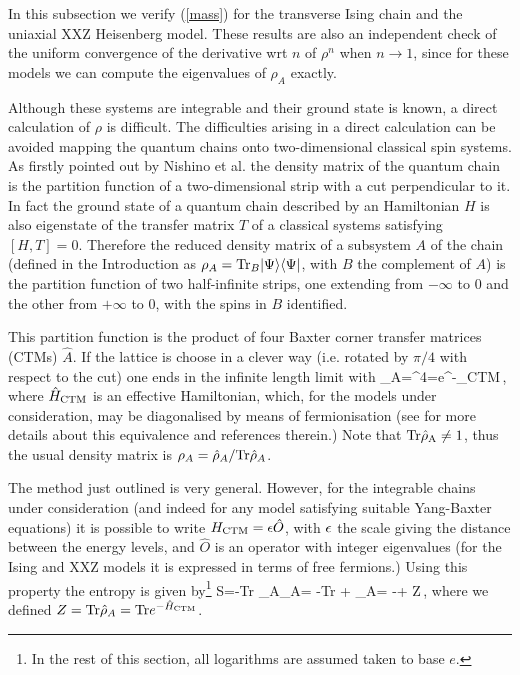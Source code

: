 \documentclass[preprint,aps]{revtex4}
\begin{document}
In this subsection we verify (\ref{mass})
for the transverse Ising chain and the uniaxial
XXZ Heisenberg model.
These results are also an
independent check of the uniform convergence of the derivative wrt $n$
of $\rho^n$ when $n\rightarrow1$, since for these models we can compute
the eigenvalues of $\rho_A$ exactly.

Although these systems are integrable and their ground state is known, a
direct calculation of $\rho$ is difficult. The difficulties arising in a
direct calculation can be avoided
mapping the quantum chains onto two-dimensional classical spin systems.
As firstly pointed out by Nishino et al. \cite{nishino}
the density matrix of the
quantum chain is the partition function of a two-dimensional strip with a cut
perpendicular to it. In fact the ground state of a quantum chain described
by an Hamiltonian $H$ is also eigenstate of the transfer matrix $T$ of a
classical systems satisfying $[H,T]=0$.
Therefore the reduced density matrix of a subsystem $A$ of the chain (defined
in the Introduction as
$\rho_A={\rm Tr}_B |\Psi\rangle\langle \Psi|$, with
$B$ the complement of $A$) is the
partition function of two half-infinite strips, one extending from $-\infty$
to $0$ and the other from $+\infty$ to 0, with the spins in $B$
identified.

This partition
function is the product of four Baxter corner transfer matrices
(CTMs)\cite{Baxter}
$\hat A$.
If the lattice is choose in a clever way (i.e. rotated by $\pi/4$ with
respect to the cut)
one ends in the infinite length limit with \cite{pkl-99}
\be
\hat{\rho}_A=^4=e^{-_{\rm CTM}}\,,
\ee
where $\hat{H}_{\rm CTM}$ is an effective Hamiltonian, which, for the
models under consideration, may be diagonalised by means
of fermionisation (see for more details about this equivalence
\cite{pkl-99} and references therein.)
Note that ${\rm Tr \hat{\rho}_A \neq 1}$, thus the usual density matrix is
$\rho_A=\hat{\rho}_A/{\rm Tr}\hat{\rho}_A$.

The method just outlined is very general. However, for the
integrable chains under consideration (and indeed for any model
satisfying suitable Yang-Baxter equations\cite{Baxter}) it is
possible to  write $H_{\rm CTM}=\epsilon \hat{O}$, with $\epsilon$ the scale giving the
distance between the energy levels, and $\hat{O}$ is an
operator with integer eigenvalues (for the Ising and XXZ models it is
expressed in terms of free fermions.)
Using this property the entropy is given by\footnote{In the rest of
this section, all logarithms are assumed taken to base $e$.}
\be
S=-{\rm Tr} \rho_A\log\rho_A=
-{\rm Tr} +
\hat{\rho}_A=
-\e{}+ \log Z\,,
\label{entrint}
\ee
where we defined $Z={\rm Tr} \hat{\rho}_A={\rm Tr} e^{-\hat{H}_{\rm CTM}}$.
\end{document}
